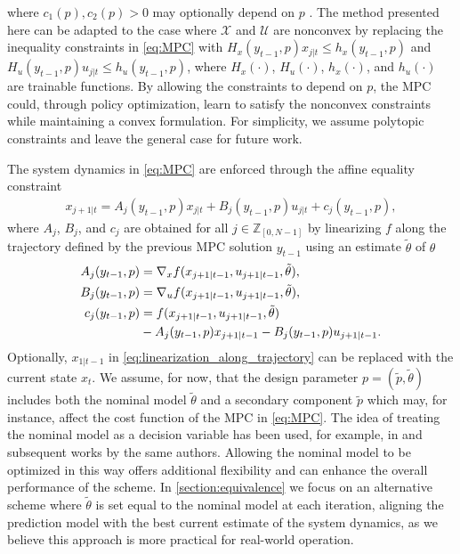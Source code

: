 \documentclass[journal,twoside,web,final]{ieeecolor}
\theoremstyle{definition}
\newcommand{\Z}{\mathbb{Z}}
\newcommand{\eb}[1]{\textcolor{blue}{#1}}
\newcommand{\rz}[1]{#1}
\begin{document}
where $c_1(p),c_2(p)>0$ may optionally depend on $p$ \cite{kerrigan2000soft}. 
\rz{The method presented here can be adapted to the case where $\mathcal{X}$ and $\mathcal{U}$ are nonconvex by replacing the inequality constraints in \cref{eq:MPC} with $H_x(y_{t-1},p) x_{j|t} \leq h_x(y_{t-1},p)$ and $H_u(y_{t-1},p) u_{j|t} \leq h_u(y_{t-1},p)$, 
where $H_x(\cdot)$, $H_u(\cdot)$, $h_x(\cdot)$, and $h_u(\cdot)$ are trainable functions. 
By allowing the constraints to depend on $p$, the MPC could, through policy optimization, learn to satisfy the nonconvex constraints while maintaining a convex formulation. 
For simplicity, we assume polytopic constraints and leave the general case for future work.}

The system dynamics in \cref{eq:MPC} are enforced through the affine equality constraint
\begin{align}
x_{j+1|t}=A_j(y_{t-1},p) x_{j|t} + B_j(y_{t-1},p) u_{j|t} + c_j(y_{t-1},p), \label{eq:MPC_prediction_model}
\end{align}
where $A_j$, $B_j$, and $c_j$ are obtained for all $j\in\Z_{[0,N-1]}$ by linearizing $f$ along the trajectory defined by the previous MPC solution $y_{t-1}$ using an estimate $\tilde{\theta}$ of $\theta$
\begin{align}
A_j(y_{t-1},p) & = \nabla_x f(x_{j+1|t-1},u_{j+1|t-1},\tilde{\theta}), \notag \\
B_j(y_{t-1},p) & = \nabla_u f(x_{j+1|t-1},u_{j+1|t-1},\tilde{\theta}), \label{eq:linearization_along_trajectory} \\
c_j(y_{t-1},p) & = f(x_{j+1|t-1},u_{j+1|t-1},\tilde{\theta}) \notag \\ & - A_j(y_{t-1},p)x_{j+1|t-1} - B_j(y_{t-1},p)u_{j+1|t-1}. \notag
\end{align}
Optionally, $x_{1|t-1}$ in \cref{eq:linearization_along_trajectory} can be replaced with the current state $x_{t}$.
We assume, for now, that the design parameter $p=(\tilde{p},\tilde{\theta})$ includes both the nominal model $\tilde{\theta}$ and a secondary component $\tilde{p}$ which may, for instance, affect the cost function of the MPC in \cref{eq:MPC}. %
The idea of treating the nominal model as a decision variable has been used, for example, in \cite{gros2019data} and subsequent works by the same authors. Allowing the nominal model to be optimized in this way offers additional flexibility and can enhance the overall performance of the scheme. In \cref{section:equivalence} we focus on an alternative scheme where $\tilde{\theta}$ is set equal to the nominal model at each iteration, aligning the prediction model with the best current estimate of the system dynamics, as we believe this approach is more practical for real-world operation.
\end{document}
